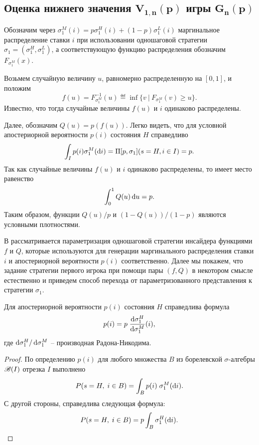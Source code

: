 {\subsection{Оценка нижнего значения $\mathbf{V_{1,n}(p)}$ игры $\mathbf{G_n(p)}$}
\label{ch3:sec:-primal-game}

Обозначим через $\sigma^M_1(i) = p \sigma^H_1(i) + (1-p) \sigma^L_1(i)$ маргинальное распределение ставки $i$ при использовании одношаговой стратегии $\sigma_1 = (\sigma^H_1, \sigma^L_1)$, а соответствующую функцию распределения обозначим $F_{\sigma^M_1}(x)$.

Возьмем случайную величину $u$, равномерно распределенную на $[0, 1]$, и положим
\begin{equation*}
  f(u) = F^{-1}_{\sigma^M_1}(u) \eqdef \inf \{ v\ |\ F_{\sigma^M_1}(v) \geq u \}.
\end{equation*}
Известно, что тогда случайные величины $f(u)$ и $i$ одинаково распределены.

Далее, обозначим $Q(u) = p(f(u))$.
Легко видеть, что для условной апостериорной вероятности $p(i)$ состояния $H$ справедливо
\begin{equation*}
  \int_I p(i) \sigma^M_1(\mathop{}\!\mathrm{d} i) = \Pi[p, \sigma_1](s = H, i \in I) = p.
\end{equation*}
Так как случайные величины $f(u)$ и $i$ одинаково распределены, то имеет место равенство
\begin{equation*}
  \int_0^1 Q(u) \mathop{}\!\mathrm{d} u = p.
\end{equation*}
Таким образом, функции $Q(u)/p$ и $(1-Q(u))/(1-p)$ являются условными плотностями.

В \cite{demeyer02} рассматривается параметризация одношаговой стратегии инсайдера функциями $f$ и $Q$, которые используются для генерации маргинального распределения ставки $i$ и апостериорной вероятности $p(i)$ соответственно.
Далее мы покажем, что задание стратегии первого игрока при помощи пары $(f, Q)$ в некотором смысле естественно и приведем способ перехода от параметризованного представления к стратегии $\sigma_1$.

\begin{proposition}
  Для апостериорной вероятности $p(i)$ состояния $H$ справедлива формула
  \begin{equation}\label{ch3:eq:p(i)}
    p(i) = p \; \frac{\mathop{}\!\mathrm{d} \sigma^H_1}{\mathop{}\!\mathrm{d} \sigma^M_1}(i),
  \end{equation}
  где $\mathop{}\!\mathrm{d} \sigma^H_1/\mathop{}\!\mathrm{d} \sigma^M_1$ -- производная Радона-Никодима.
\end{proposition}
\begin{proof}
  По определению $p(i)$ для любого множества $B$ из борелевской $\sigma$-алгебры $\mathscr{B}(I)$ отрезка $I$ выполнено
  \begin{equation*}
    P(s = H, \; i \in B) = \int_B p(i) \; \sigma^M_1(\mathop{}\!\mathrm{d} i).
  \end{equation*}
  С другой стороны, справедлива следующая формула:
  \begin{equation*}
    P(s = H, \; i \in B) = p \int_B \sigma^H_1(\mathop{}\!\mathrm{d} i).
  \end{equation*}


\end{proof}}
